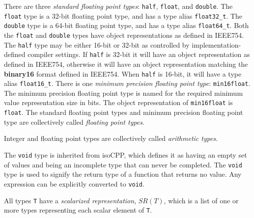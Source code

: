 \p There are three \textit{standard floating point types}: \texttt{half},
\texttt{float}, and \texttt{double}. The \texttt{float} type is a 32-bit
floating point type, and has a type alias \texttt{float32\_t}. The
\texttt{double} type is a 64-bit floating point type, and has a type alias
\texttt{float64\_t}. Both the \texttt{float} and \texttt{double} types have
object representations as defined in \gls{IEEE754}. The \texttt{half} type may
be either 16-bit or 32-bit as controlled by implementation-defined compiler
settings. If \texttt{half} is 32-bit it will have an object representation as
defined in \gls{IEEE754}, otherwise it will have an object representation
matching the \textbf{binary16} format defined in \gls{IEEE754}. When
\texttt{half} is 16-bit, it will have a type alias \texttt{float16\_t}. There is
one \textit{minimum precision floating point type}: \texttt{min16float}. The
minimum precision floating point type is named for the required minimum value
representation size in bits. The object representation of \texttt{min16float} is
\texttt{float}. The standard floating point types and minimum precision floating
point type are collectively called \textit{floating point types}.

\p Integer and floating point types are collectively called \textit{arithmetic
types}.

\p The \texttt{void} type is inherited from \gls{isoCPP}, which defines it as
having an empty set of values and being an incomplete type that can never be
completed. The \texttt{void} type is used to signify the return type of a
function that returns no value. Any expression can be explicitly converted to
\texttt{void}.


\p All types \texttt{T} have a \textit{scalarized representation}, \(SR(T)\),
which is a list of one or more types representing each scalar element of
\texttt{T}.


